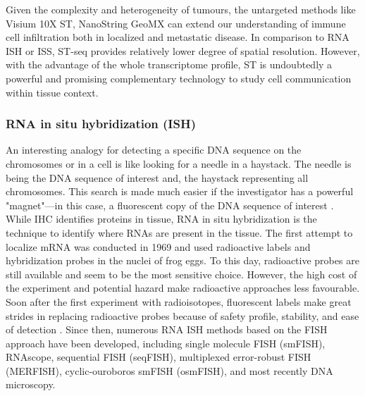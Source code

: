 Given the complexity and heterogeneity of tumours, the untargeted methods like Visium 10X  ST, NanoString GeoMX can extend our understanding of immune cell infiltration both in localized and metastatic disease. In comparison to RNA ISH or ISS, ST-seq provides relatively lower degree of spatial resolution. However, with the advantage of the whole transcriptome profile, ST is undoubtedly a powerful and promising complementary technology to study cell communication within tissue context.  

\subsubsection{RNA in situ hybridization (ISH)}
An interesting analogy for detecting a specific DNA sequence on the chromosomes or in a cell is like looking for a needle in a haystack. The needle is being the DNA sequence of interest and, the haystack representing all chromosomes. This search is made much easier if the investigator has a powerful "magnet"—in this case, a fluorescent copy of the DNA sequence of interest \cite{Connor2008natureEdu}. While IHC identifies proteins in tissue, RNA in situ hybridization is the technique to identify where RNAs are present in the tissue. The first attempt to localize mRNA was conducted in 1969 and used radioactive labels and hybridization probes in the nuclei of frog eggs. To this day, radioactive probes are still available and seem to be the most sensitive choice. However, the high cost of the experiment and potential hazard make radioactive approaches less favourable. Soon after the first experiment with radioisotopes, fluorescent labels make great strides in replacing radioactive probes because of safety profile, stability, and ease of detection \cite{rudkin1977high, Connor2008natureEdu}. Since then, numerous RNA ISH methods based on the FISH approach have been developed, including single molecule FISH (smFISH), RNAscope, sequential FISH (seqFISH), multiplexed error-robust FISH (MERFISH), cyclic-ouroboros smFISH (osmFISH), and most recently DNA microscopy. 

